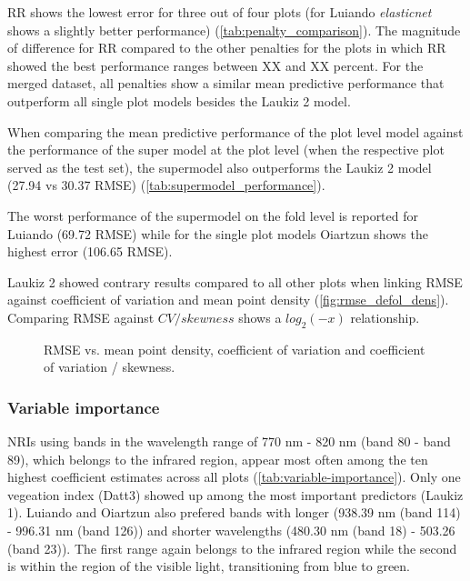 \documentclass[review]{elsarticle}
\begin{document}
\ac{RR} shows the lowest error for three out of four plots (for Luiando \textit{elasticnet} shows a slightly better performance) (\autoref{tab:penalty_comparison}).
The magnitude of difference for \ac{RR} compared to the other penalties for the plots in which \ac{RR} showed the best performance ranges between XX and XX percent.
For the merged dataset, all penalties show a similar mean predictive performance that outperform all single plot models besides the Laukiz 2 model.

When comparing the mean predictive performance of the plot level model against the performance of the super model at the plot level (when the respective plot served as the test set), the supermodel also outperforms the Laukiz 2 model (27.94 vs 30.37 RMSE) (\autoref{tab:supermodel_performance}).

The worst performance of the supermodel on the fold level is reported for Luiando (69.72 RMSE) while for the single plot models Oiartzun shows the highest error (106.65 RMSE).

Laukiz 2 showed contrary results compared to all other plots when linking \ac{RMSE} against coefficient of variation and mean point density (\autoref{fig:rmse_defol_dens}).
Comparing RMSE against $CV/skewness$ shows a $log_{2}(-x)$ relationship.

\begin{figure} [b!]
	\begin{center}
		\caption{RMSE vs. mean point density, coefficient of variation and coefficient of variation / skewness.}
		\label{fig:plot-characteristics}
	\end{center}
\end{figure}

\subsubsection{Variable importance}

\ac{NRI}s using bands in the wavelength range of 770 nm - 820 nm (band 80 - band 89), which belongs to the infrared region, appear most often among the ten highest coefficient estimates across all plots (\autoref{tab:variable-importance}).
Only one vegeation index (Datt3) showed up among the most important predictors (Laukiz 1).
Luiando and Oiartzun also prefered bands with longer (938.39 nm (band 114) - 996.31 nm (band 126)) and shorter wavelengths (480.30 nm (band 18) - 503.26 (band 23)).
The first range again belongs to the infrared region while the second is within the region of the visible light, transitioning from blue to green.
\end{document}
